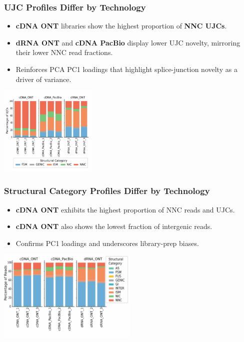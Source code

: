 \documentclass[aspectratio=169]{beamer}
\begin{document}
\begin{frame}
  \frametitle{UJC Profiles Differ by Technology}
  \begin{itemize}
    \item \textbf{cDNA ONT} libraries show the highest proportion of \textbf{NNC UJCs}.
    \item \textbf{dRNA ONT} and \textbf{cDNA PacBio} display lower UJC novelty, mirroring their lower NNC read fractions.
    \item Reinforces PCA PC1 loadings that highlight splice-junction novelty as a driver of variance.
  \end{itemize}
  \vspace{0.3cm}
  \centering
  \includegraphics[width=0.35\textwidth]{Genome Res_figure2_d.jpg}
\end{frame}

\begin{frame}
  \frametitle{Structural Category Profiles Differ by Technology}
  \begin{itemize}
    \item \textbf{cDNA ONT} exhibits the highest proportion of NNC reads and UJCs.
    \item \textbf{cDNA ONT} also shows the lowest fraction of intergenic reads.
    \item Confirms PC1 loadings and underscores library-prep biases.
  \end{itemize}
  \vspace{0.3cm}
  \centering
  \includegraphics[width=0.5\textwidth]{Genome Res_figure2_c.jpg}
\end{frame}
\end{document}
